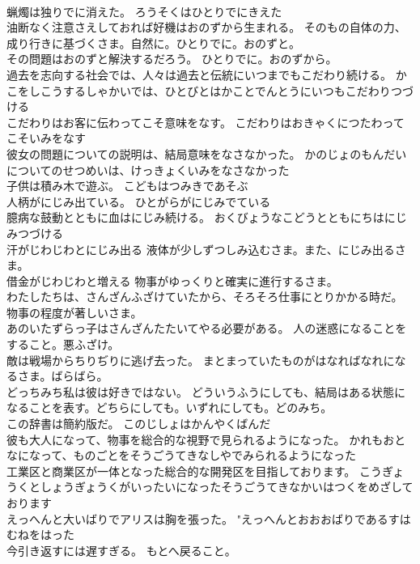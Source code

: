 \documentclass[8pt]{extreport}
\begin{document}
\begin{CJK}{UTF8}{min}
\\	蝋燭は独りでに消えた。	ろうそくはひとりでにきえた 
\\	油断なく注意さえしておれば好機はおのずから生まれる。	そのもの自体の力、成り行きに基づくさま。自然に。ひとりでに。おのずと。
\\	その問題はおのずと解決するだろう。	ひとりでに。おのずから。
\\	過去を志向する社会では、人々は過去と伝統にいつまでもこだわり続ける。	かこをしこうするしゃかいでは、ひとびとはかことでんとうにいつもこだわりつづける 
\\	こだわりはお客に伝わってこそ意味をなす。	こだわりはおきゃくにつたわってこそいみをなす 
\\	彼女の問題についての説明は、結局意味をなさなかった。	かのじょのもんだいについてのせつめいは、けっきょくいみをなさなかった 
\\	子供は積み木で遊ぶ。	こどもはつみきであそぶ 
\\	人柄がにじみ出ている。	ひとがらがにじみでている 
\\	臆病な鼓動とともに血はにじみ続ける。	おくびょうなこどうとともにちはにじみつづける 
\\	汗がじわじわとにじみ出る	液体が少しずつしみ込むさま。また、にじみ出るさま。
\\	借金がじわじわと増える	物事がゆっくりと確実に進行するさま。
\\	わたしたちは、さんざんふざけていたから、そろそろ仕事にとりかかる時だ。	物事の程度が著しいさま。
\\	あのいたずらっ子はさんざんたたいてやる必要がある。	人の迷惑になることをすること。悪ふざけ。
\\	敵は戦場からちりぢりに逃げ去った。	まとまっていたものがはなればなれになるさま。ばらばら。
\\	どっちみち私は彼は好きではない。	どういうふうにしても、結局はある状態になることを表す。どちらにしても。いずれにしても。どのみち。
\\	この辞書は簡約版だ。	このじしょはかんやくばんだ 
\\	彼も大人になって、物事を総合的な視野で見られるようになった。	かれもおとなになって、ものごとをそうごうてきなしやでみられるようになった 
\\	工業区と商業区が一体となった総合的な開発区を目指しております。	こうぎょうくとしょうぎょうくがいったいになったそうごうてきなかいはつくをめざしております 
\\	えっへんと大いばりでアリスは胸を張った。	"えっへんとおおおばりであるすはむねをはった 
\\	今引き返すには遅すぎる。	もとへ戻ること。

\end{CJK}
\end{document}
